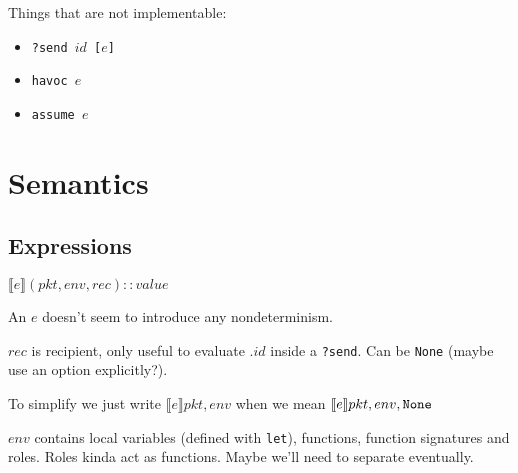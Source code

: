 \documentclass{report}
\newcommand\sem[1]{\llbracket #1\rrbracket}
\newcommand{\pkt}{\ensuremath{pkt}}
\newcommand{\env}{\ensuremath{env}}
\begin{document}
Things that are not implementable:
%
\begin{itemize}

\item \texttt{?send $id$ [$e$]}
\item \texttt{havoc $e$}
\item \texttt{assume $e$}

\end{itemize}

\section{Semantics}
\subsection{Expressions}
$\sem{e}(\pkt,\env, rec) :: value$

An $e$ doesn't seem to introduce any nondeterminism.

$rec$ is recipient, only useful to evaluate $.id$ inside a \texttt{?send}.
Can be \texttt{None} (maybe use an option explicitly?).

To simplify we just write $\sem{e}\pkt,\env$ when we mean $\sem{e}\pkt,\env,{\tt None}$

$\env$ contains local variables (defined with \texttt{let}), functions, function signatures and
roles. Roles kinda act as functions. Maybe we'll need to separate eventually.
\end{document}
